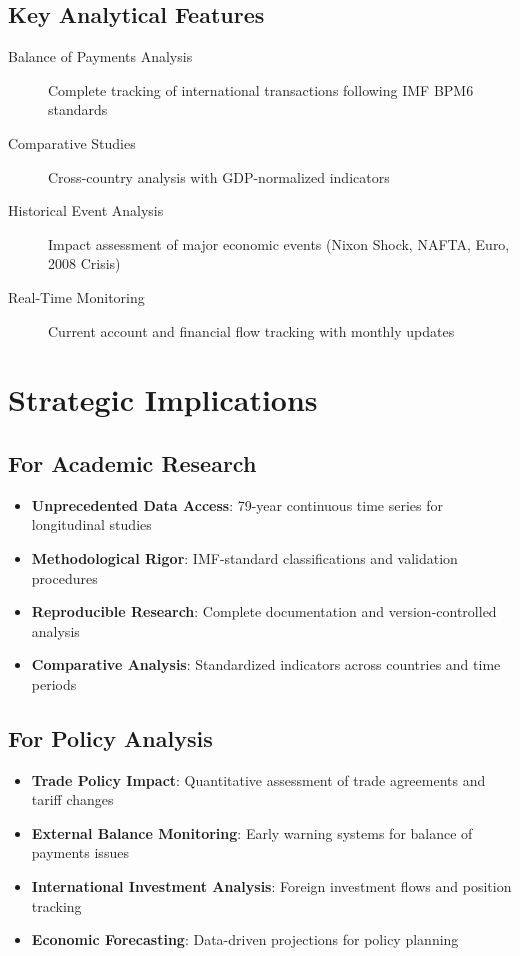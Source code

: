 \documentclass[11pt,a4paper]{article}
\begin{document}
\subsection{Key Analytical Features}
\begin{description}
    \item[Balance of Payments Analysis] Complete tracking of international transactions following IMF BPM6 standards
    \item[Comparative Studies] Cross-country analysis with GDP-normalized indicators
    \item[Historical Event Analysis] Impact assessment of major economic events (Nixon Shock, NAFTA, Euro, 2008 Crisis)
    \item[Real-Time Monitoring] Current account and financial flow tracking with monthly updates
\end{description}

\section{Strategic Implications}

\subsection{For Academic Research}
\begin{itemize}
    \item \textbf{Unprecedented Data Access}: 79-year continuous time series for longitudinal studies
    \item \textbf{Methodological Rigor}: IMF-standard classifications and validation procedures
    \item \textbf{Reproducible Research}: Complete documentation and version-controlled analysis
    \item \textbf{Comparative Analysis}: Standardized indicators across countries and time periods
\end{itemize}

\subsection{For Policy Analysis}
\begin{itemize}
    \item \textbf{Trade Policy Impact}: Quantitative assessment of trade agreements and tariff changes
    \item \textbf{External Balance Monitoring}: Early warning systems for balance of payments issues
    \item \textbf{International Investment Analysis}: Foreign investment flows and position tracking
    \item \textbf{Economic Forecasting}: Data-driven projections for policy planning
\end{itemize}
\end{document}
